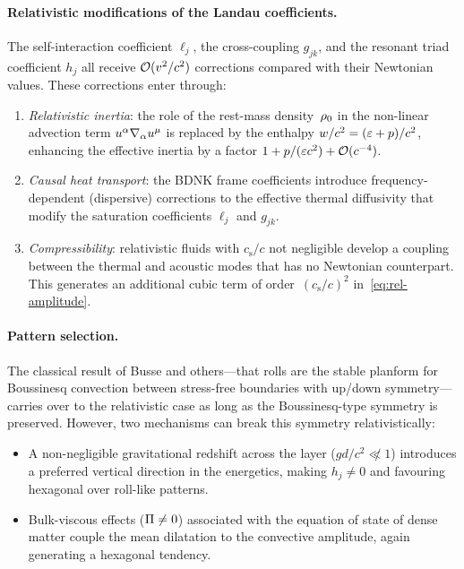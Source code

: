 \paragraph{Relativistic modifications of the Landau coefficients.}
The self-interaction coefficient $\ell_{j}$, the cross-coupling
$g_{jk}$, and the resonant triad coefficient $h_{j}$ all receive
$\mathcal{O}(v^{2}/c^{2})$ corrections compared with their Newtonian
values.  These corrections enter through:
\begin{enumerate}
\item \emph{Relativistic inertia}: the role of the rest-mass
  density~$\rho_0$ in the non-linear advection term
  $u^{\alpha}\nabla_{\alpha} u^{\mu}$ is replaced by the enthalpy
  $w/c^{2}=(\varepsilon+p)/c^{2}$, enhancing the effective
  inertia by a factor $1+p/(\varepsilon c^{2})+\mathcal{O}(c^{-4})$.
\item \emph{Causal heat transport}: the BDNK frame coefficients
  introduce frequency-dependent (dispersive) corrections to the
  effective thermal diffusivity that modify the saturation
  coefficients $\ell_{j}$ and $g_{jk}$.
\item \emph{Compressibility}: relativistic fluids with
  $c_{\mathrm{s}}/c$ not negligible develop a coupling between
  the thermal and acoustic modes that has no Newtonian counterpart.
  This generates an additional cubic term of
  order~$(c_{\mathrm{s}}/c)^{2}$ in~\eqref{eq:rel-amplitude}.
\end{enumerate}

\paragraph{Pattern selection.}
The classical result of Busse and others---that rolls are the stable
planform for Boussinesq convection between stress-free boundaries
with up/down symmetry---carries over to the relativistic case as
long as the Boussinesq-type symmetry is preserved.  However, two
mechanisms can break this symmetry relativistically:
\begin{itemize}
\item A non-negligible gravitational redshift across the layer
  ($gd/c^{2}\not\ll 1$) introduces a preferred vertical direction
  in the energetics, making $h_{j}\neq 0$ and favouring hexagonal
  over roll-like patterns.
\item Bulk-viscous effects ($\Pi\neq 0$) associated with the
  equation of state of dense matter couple the mean dilatation to
  the convective amplitude, again generating a hexagonal tendency.
\end{itemize}

